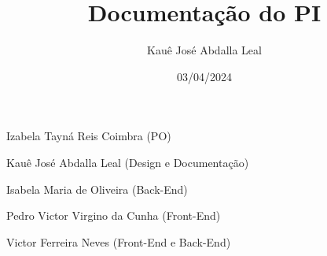 \documentclass{article}
\begin{document}
\title{Documentação do PI}
\author{Kauê José Abdalla Leal}
\date{03/04/2024}

\maketitle

\begin{center}
      Izabela Tayná Reis Coimbra (PO)

      Kauê José Abdalla Leal (Design e Documentação)

      Isabela Maria de Oliveira (Back-End)

      Pedro Victor Virgino da Cunha (Front-End)

      Victor Ferreira Neves (Front-End e Back-End)
\end{center}
\end{document}
